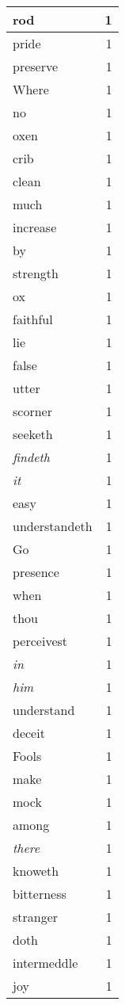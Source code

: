 \begin{center}
\begin{longtable}{l|r}
rod & 1\\ \hline 
pride & 1\\ \hline 
preserve & 1\\ \hline 
Where & 1\\ \hline 
no & 1\\ \hline 
oxen & 1\\ \hline 
crib & 1\\ \hline 
clean & 1\\ \hline 
much & 1\\ \hline 
increase & 1\\ \hline 
by & 1\\ \hline 
strength & 1\\ \hline 
ox & 1\\ \hline 
faithful & 1\\ \hline 
lie & 1\\ \hline 
false & 1\\ \hline 
utter & 1\\ \hline 
scorner & 1\\ \hline 
seeketh & 1\\ \hline 
\emph{findeth} & 1\\ \hline 
\emph{it} & 1\\ \hline 
easy & 1\\ \hline 
understandeth & 1\\ \hline 
Go & 1\\ \hline 
presence & 1\\ \hline 
when & 1\\ \hline 
thou & 1\\ \hline 
perceivest & 1\\ \hline 
\emph{in} & 1\\ \hline 
\emph{him} & 1\\ \hline 
understand & 1\\ \hline 
deceit & 1\\ \hline 
Fools & 1\\ \hline 
make & 1\\ \hline 
mock & 1\\ \hline 
among & 1\\ \hline 
\emph{there} & 1\\ \hline 
knoweth & 1\\ \hline 
bitterness & 1\\ \hline 
stranger & 1\\ \hline 
doth & 1\\ \hline 
intermeddle & 1\\ \hline 
joy & 1\\ \hline 

\end{longtable}
\end{center}
